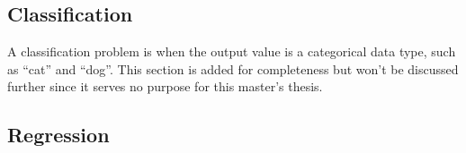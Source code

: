         \subsection{Classification}
        \label{sec:classification-supervised-learning-background}

            A classification problem is when the output value is a categorical data type, such as ``cat'' and ``dog''.
            This section is added for completeness but won't be discussed further since it serves no purpose for this master's thesis.

        \subsection{Regression}
        \label{sec:regression-supervised-learning-background}

